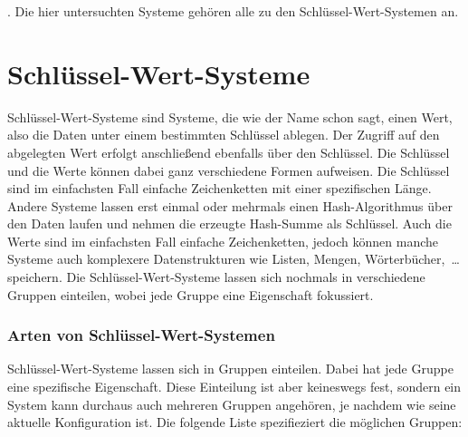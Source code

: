 . Die hier untersuchten Systeme gehören alle zu den Schlüssel-Wert-Systemen an.

\section{Schlüssel-Wert-Systeme}
Schlüssel-Wert-Systeme sind Systeme, die wie der Name schon sagt, einen Wert,
also die Daten unter einem bestimmten Schlüssel ablegen. Der Zugriff auf den
abgelegten Wert erfolgt anschließend ebenfalls über den Schlüssel. Die Schlüssel
und die Werte können dabei ganz verschiedene Formen aufweisen. Die Schlüssel
sind im einfachsten Fall einfache Zeichenketten mit einer spezifischen Länge.
Andere Systeme lassen erst einmal oder mehrmals einen Hash-Algorithmus über den
Daten laufen und nehmen die erzeugte Hash-Summe als Schlüssel. Auch die Werte
sind im einfachsten Fall einfache Zeichenketten, jedoch können manche Systeme
auch komplexere Datenstrukturen wie Listen, Mengen, Wörterbücher,~\dots{}
speichern. Die Schlüssel-Wert-Systeme lassen sich nochmals in verschiedene
Gruppen einteilen, wobei jede Gruppe eine Eigenschaft fokussiert.

\subsubsection{Arten von Schlüssel-Wert-Systemen}
Schlüssel-Wert-Systeme lassen sich in Gruppen einteilen. Dabei hat jede Gruppe
eine spezifische Eigenschaft. Diese Einteilung ist aber keineswegs fest, sondern
ein System kann durchaus auch mehreren Gruppen angehören, je nachdem wie seine
aktuelle Konfiguration ist. Die folgende Liste spezifieziert die möglichen
Gruppen:

